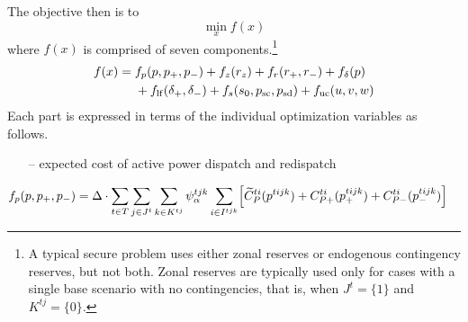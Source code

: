 \documentclass[12pt]{article}
\numberwithin{equation}{section}
\numberwithin{table}{section}
\numberwithin{figure}{section}
\begin{document}
The objective then is to
\begin{equation}
\min_x f(x)
\label{eq:objfcn1}
\end{equation}
where $f(x)$ is comprised of seven components.\footnote{A typical secure problem uses either zonal reserves or endogenous contingency reserves, but not both. Zonal reserves are typically used only for cases with a single base scenario with no contingencies, that is, when $J^t = \{1\}$ and $K^{tj} = \{0\}$.}
\begin{align}
f(x) = \;& f_p(p,p_+,p_-) + f_z(r_z) + f_r(r_+, r_-) + f_\delta(p) \nonumber \\
    &{} + f_{\rm lf}(\delta_+, \delta_-)
     + f_s(s_0, p_{\rm sc}, p_{\rm sd}) + f_{\rm uc}(u,v,w) \label{eq:mostobjective}
\end{align}
Each part is expressed in terms of the individual optimization variables as follows.
\begin{itemize}
\item[--] expected cost of active power dispatch and redispatch
\end{itemize}
\begin{align}
f_p(p,p_+,p_-) &= \Delta \cdot \sum_{t\in T} \sum_{j\in J^t} \sum_{k\in K^{tj}} \psi_\alpha^{tjk} \sum_{i\in I^{tjk}}
    \Bigl[\widetilde{C}_P^{ti}(p^{tijk}) + C_{P+}^{ti}(p_+^{tijk}) + C_{P-}^{ti}(p_-^{tijk}) \Bigr]
\label{eq:most_energy_cost}
\end{align}
\end{document}
